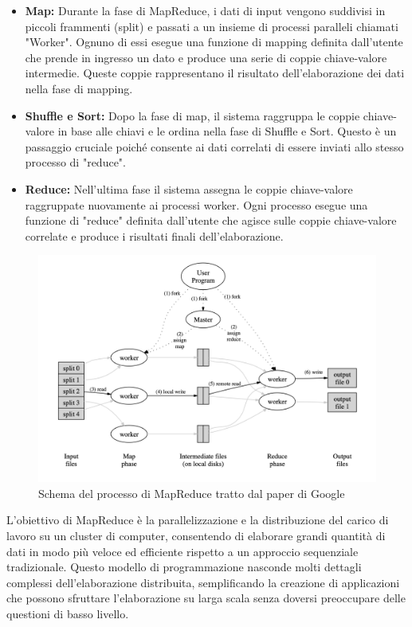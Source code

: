 \begin{itemize}
    \item \textbf{Map:} Durante la fase di MapReduce, i dati di input vengono suddivisi in piccoli frammenti (split) e passati a un insieme di processi paralleli chiamati "Worker". Ognuno di essi esegue una funzione di mapping definita dall'utente che prende in ingresso un dato e produce una serie di coppie chiave-valore intermedie. Queste coppie rappresentano il risultato dell'elaborazione dei dati nella fase di mapping.
    \item \textbf{Shuffle e Sort:} Dopo la fase di map, il sistema raggruppa le coppie chiave-valore in base alle chiavi e le ordina nella fase di Shuffle e Sort. Questo è un passaggio cruciale poiché consente ai dati correlati di essere inviati allo stesso processo di "reduce".
    \item \textbf{Reduce:} Nell'ultima fase il sistema assegna le coppie chiave-valore raggruppate nuovamente ai processi worker. Ogni processo esegue una funzione di "reduce" definita dall'utente che agisce sulle coppie chiave-valore correlate e produce i risultati finali dell'elaborazione.
\end{itemize}

\begin{figure}[H]
    \centering
    \includegraphics[scale=.4]{img/mapReduceGoogle.png}
    \caption{Schema del processo di MapReduce tratto dal paper di Google}
    \label{mapReduceGoogle}
\end{figure}
L'obiettivo di MapReduce è la parallelizzazione e la distribuzione del carico di lavoro su un cluster di computer, consentendo di elaborare grandi quantità di dati in modo più veloce ed efficiente rispetto a un approccio sequenziale tradizionale. Questo modello di programmazione nasconde molti dettagli complessi dell'elaborazione distribuita, semplificando la creazione di applicazioni che possono sfruttare l'elaborazione su larga scala senza doversi preoccupare delle questioni di basso livello.

